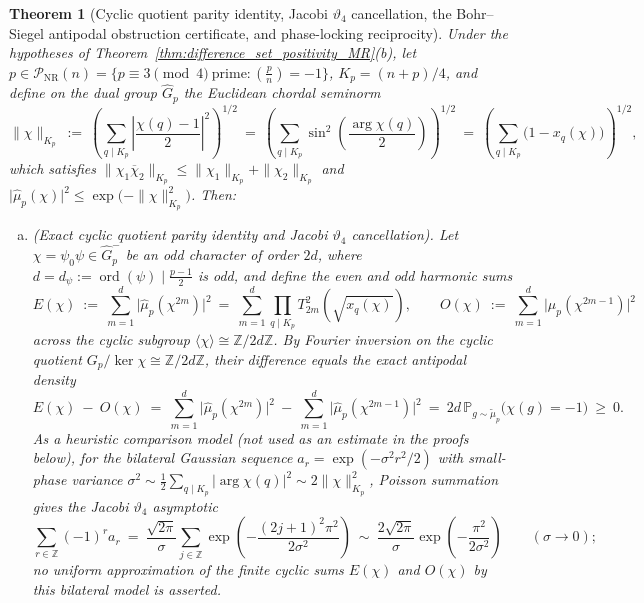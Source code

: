 \documentclass[11pt, a4paper]{article}
\theoremstyle{plain}
\newtheorem{theorem}{Theorem}[section]
\theoremstyle{definition}
\newcommand{\Z}{\mathbb{Z}}
\newcommand{\leg}[2]{\left(\frac{#1}{#2}\right)}
\begin{document}
\begin{theorem}[Cyclic quotient parity identity, Jacobi $\vartheta_4$ cancellation, the Bohr--Siegel antipodal obstruction certificate, and phase-locking reciprocity]\label{thm:bohr_siegel_annihilation}\label{thm:bohr_siegel_obstruction_certificate}
Under the hypotheses of Theorem~\ref{thm:difference_set_positivity_MR}(b), let $p\in\mathcal{P}_{\mathrm{NR}}(n)=\big\{p\equiv3\pmod 4\ \text{prime}:\leg{p}{n}=-1\big\}$, $K_p=(n+p)/4$, and define on the dual group $\widehat{G}_p$ the Euclidean chordal seminorm
\begin{equation}\label{eq:euclidean_chordal_norm}
\|\chi\|_{K_p}\ :=\ \left(\sum_{q\mid K_p}\left|\frac{\chi(q)-1}{2}\right|^{2}\right)^{1/2}\ =\ \left(\sum_{q\mid K_p}\sin^{2}\!\left(\frac{\arg\chi(q)}{2}\right)\right)^{1/2}\ =\ \left(\sum_{q\mid K_p}\big(1-x_q(\chi)\big)\right)^{1/2},
\end{equation}
which satisfies $\|\chi_1\overline{\chi}_2\|_{K_p}\le\|\chi_1\|_{K_p}+\|\chi_2\|_{K_p}$ and $\big|\widehat{\mu}_p(\chi)\big|^{2}\le\exp\big(-\|\chi\|_{K_p}^{2}\big)$. Then:
\begin{enumerate}[(a)]
    \item \emph{(Exact cyclic quotient parity identity and Jacobi $\vartheta_4$ cancellation).} Let $\chi=\psi_0\psi\in\widehat{G}_p^{-}$ be an odd character of order $2d$, where $d=d_{\psi}:=\operatorname{ord}(\psi)\mid\frac{p-1}{2}$ is odd, and define the even and odd harmonic sums
    \[
    E(\chi)\ :=\ \sum_{m=1}^{d}\big|\widehat{\mu}_p(\chi^{2m})\big|^{2}\ =\ \sum_{m=1}^{d}\prod_{q\mid K_p}T_{2m}^{2}\!\left(\sqrt{x_q(\chi)}\right),\qquad O(\chi)\ :=\ \sum_{m=1}^{d}\big|\widehat{\mu}_p(\chi^{2m-1})\big|^{2}
    \]
    across the cyclic subgroup $\langle\chi\rangle\cong\Z/2d\Z$. By Fourier inversion on the cyclic quotient $G_p/\ker\chi\cong\Z/2d\Z$, their difference equals the exact antipodal density
    \begin{equation}\label{eq:cyclic_quotient_parity_identity}
    E(\chi)\ -\ O(\chi)\ =\ \sum_{m=1}^{d}\big|\widehat{\mu}_p(\chi^{2m})\big|^{2}\ -\ \sum_{m=1}^{d}\big|\widehat{\mu}_p(\chi^{2m-1})\big|^{2}\ =\ 2d\,\mathbb{P}_{g\sim\widetilde{\mu}_p}\!\big(\chi(g)=-1\big)\ \ge\ 0.
    \end{equation}
    As a heuristic comparison model (not used as an estimate in the proofs below), for the bilateral Gaussian sequence $a_r=\exp(-\sigma^2r^2/2)$ with small-phase variance $\sigma^2\sim\frac12\sum_{q\mid K_p}$\linebreak $|\arg\chi(q)|^2\sim 2\|\chi\|_{K_p}^2$, Poisson summation gives the Jacobi $\vartheta_4$ asymptotic
    \[
    \sum_{r\in\mathbb Z}(-1)^r a_r\ =\ \frac{\sqrt{2\pi}}{\sigma}\sum_{j\in\mathbb Z}\exp\!\left(-\frac{(2j+1)^2\pi^2}{2\sigma^2}\right)\ \sim\ \frac{2\sqrt{2\pi}}{\sigma}\exp\!\left(-\frac{\pi^2}{2\sigma^2}\right)\qquad (\sigma\to0);
    \]
    no uniform approximation of the finite cyclic sums $E(\chi)$ and $O(\chi)$ by this bilateral model is asserted.


\end{enumerate}
\end{theorem}
\end{document}
